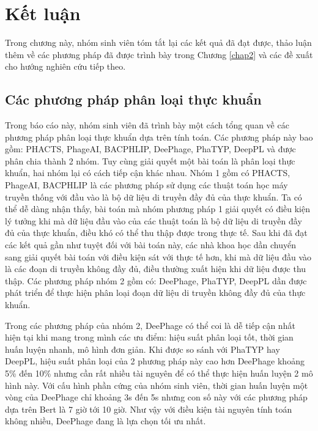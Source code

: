 
\chapter{Kết luận}
Trong chương này, nhóm sinh viên tóm tắt lại các kết quả đã đạt được, thảo luận thêm về các phương pháp đã được trình bày trong Chương \ref{chap2} và các đề xuất cho hướng nghiên cứu tiếp theo.

\section{Các phương pháp phân loại thực khuẩn}
Trong báo cáo này, nhóm sinh viên đã trình bày một cách tổng quan về các phương pháp phân loại thực khuẩn dựa trên tính toán. Các phương pháp này bao gồm: PHACTS, PhageAI, BACPHLIP, DeePhage, PhaTYP, DeepPL và được phân chia thành 2 nhóm. Tuy cùng giải quyết một bài toán là phân loại thực khuẩn, hai nhóm lại có cách tiếp cận khác nhau. Nhóm 1 gồm có PHACTS, PhageAI, BACPHLIP là các phương pháp sử dụng các thuật toán học máy truyền thống với đầu vào là bộ dữ liệu di truyền đầy đủ của thực khuẩn. Ta có thể dễ dàng nhận thấy, bài toán mà nhóm phương pháp 1 giải quyết có điều kiện lý tưởng khi mà dữ liệu đầu vào của các thuật toán là bộ dữ liệu di truyền đầy đủ của thực khuẩn, điều khó có thể thu thập được trong thực tế. Sau khi đã đạt các kết quả gần như tuyệt đối với bài toán này, các nhà khoa học dần chuyển sang giải quyết bài toán với điều kiện sát với thực tế hơn, khi mà dữ liệu đầu vào là các đoạn di truyền không đầy đủ, điều thường xuất hiện khi dữ liệu được thu thập. Các phương pháp nhóm 2 gồm có: DeePhage, PhaTYP, DeepPL dần được phát triển để thực hiện phân loại đoạn dữ liệu di truyền không đầy đủ của thực khuẩn.

Trong các phương pháp của nhóm 2, DeePhage có thể coi là dễ tiếp cận nhất hiện tại khi mang trong mình các ưu điểm: hiệu suất phân loại tốt, thời gian huấn luyện nhanh, mô hình đơn giản. Khi được so sánh với PhaTYP hay DeepPL, hiệu suất phân loại của 2 phương pháp này cao hơn DeePhage khoảng 5\% đến 10\% nhưng cần rất nhiều tài nguyên để có thể thực hiện huấn luyện 2 mô hình này. Với cấu hình phần cứng của nhóm sinh viên, thời gian huấn luyện một vòng của DeePhage chỉ khoảng 3s đến 5s nhưng con số này với các phương pháp dựa trên Bert là 7 giờ tới 10 giờ. Như vậy với điều kiện tài nguyên tính toán không nhiều, DeePhage đang là lựa chọn tối ưu nhất.

